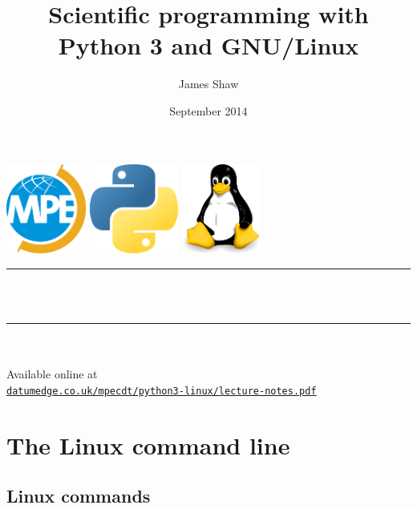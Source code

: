 \documentclass[a4paper,twoside,titlepage]{memoir}
\title{Scientific programming with Python 3 and GNU/Linux}
\author{James Shaw}
\date{September 2014}
\begin{document}
\frontmatter
\thispagestyle{plain}
\begin{titlingpage}
\makeatletter
\begin{center}
\includegraphics[height=8em]{mpe.png}\hspace{2em}
\includegraphics[height=8em]{python.png}\hspace{2em}
\includegraphics[height=8em]{tux.png} \\[48pt]

\rule{\textwidth}{.4pt} \\[12pt]
{ \huge \bfseries \@title \\[16pt] } \rule{\textwidth}{.4pt} \\[54pt]
{\LARGE \@author}
\vfill
{\Large \@date} \\[48pt]
Available online at \\ \href{http://www.datumedge.co.uk/mpecdt/python3-linux/lecture-notes.pdf}{\texttt{datumedge.co.uk/mpecdt/python3-linux/lecture-notes.pdf}}
\end{center}
\makeatother
\end{titlingpage}

\cleardoublepage

\tableofcontents*

\mainmatter

\chapter{The Linux command line}
\label{chap:linux}

\section{Linux commands}
\end{document}

